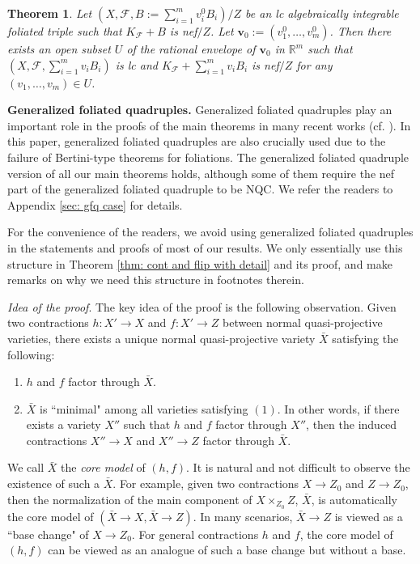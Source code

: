 \documentclass[11pt]{amsart}
\numberwithin{equation}{section}
\newcommand{\Ff}{\mathcal{F}}
\newtheorem{thm}{Theorem}[section]
\theoremstyle{definition}
\theoremstyle{definition}
\theoremstyle{definition}
\begin{document}
\begin{thm}\label{thm: shokurov polytope foliation}
    Let $(X,\Ff,B:=\sum_{i=1}^mv^0_iB_i)/Z$ be an lc algebraically integrable foliated triple such that $K_{\Ff}+B$ is nef$/Z$. Let $\bm{v}_0:=(v^0_1,\dots,v^0_m)$. Then there exists an open subset $U$ of the rational envelope of $\bm{v}_0$ in $\mathbb R^m$ such that $(X,\Ff,\sum_{i=1}^mv_iB_i)$ is lc and $K_{\Ff}+\sum_{i=1}^mv_iB_i$ is nef$/Z$ for any $(v_1,\dots,v_m)\in U$.
\end{thm}

\medskip

\noindent\textbf{Generalized foliated quadruples.} Generalized foliated quadruples play an important role in the proofs of the main theorems in many recent works (cf. \cite{LLM23,LMX23,CHLX23}). In this paper, generalized foliated quadruples are also crucially used due to the failure of Bertini-type theorems for foliations. The generalized foliated quadruple version of all our main theorems holds, although some of them require the nef part of the generalized foliated quadruple to be NQC. We refer the readers to Appendix \ref{sec: gfq case} for details. 

For the convenience of the readers, we avoid using generalized foliated quadruples in the statements and proofs of most of our results. We only essentially use this structure in Theorem \ref{thm: cont and flip with detail} and its proof, and make remarks on why we need this structure in footnotes therein. 

\medskip
\noindent\textit{Idea of the proof}. The key idea of the proof is the following observation. Given two contractions $h: X'\rightarrow X$ and $f: X'\rightarrow Z$ between normal quasi-projective varieties, there exists a unique normal quasi-projective variety $\bar X$ satisfying the following:
\begin{enumerate}
    \item $h$ and $f$ factor through $\bar X$.
    \item $\bar X$ is ``minimal" among all varieties satisfying $(1)$. In other words, if there exists a variety $X''$ such that $h$ and $f$ factor through $X''$, then the induced contractions $X''\rightarrow X$ and $X''\rightarrow Z$ factor through $\bar X$.
\end{enumerate}
We call $\bar X$ the \emph{core model} of $(h,f)$. It is natural and not difficult to observe the existence of such a $\bar X$. For example, given two contractions $X\rightarrow Z_0$ and $Z\rightarrow Z_0$, then the normalization of the main component of $X\times_{Z_0}Z$, $\bar X$, is automatically the core model of $(\bar X\rightarrow X,\bar X\rightarrow Z)$. In many scenarios, $\bar X\rightarrow Z$ is viewed as a ``base change" of $X\rightarrow Z_0$. For general contractions $h$ and $f$, the core model of $(h,f)$ can be viewed as an analogue of such a base change but without a base. 
\end{document}
